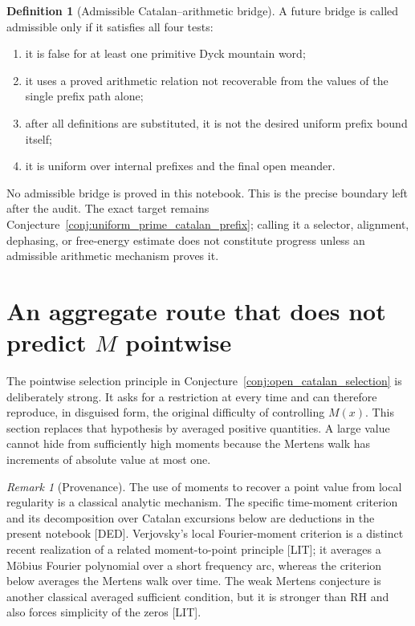 \documentclass[11pt]{amsart}
\numberwithin{equation}{section}
\theoremstyle{plain}
\theoremstyle{definition}
\newtheorem{definition}[theorem]{Definition}
\theoremstyle{remark}
\newtheorem{remark}[theorem]{Remark}
\newcommand{\Mert}{M}
\begin{document}
\begin{definition}[Admissible Catalan--arithmetic bridge]
\label{def:admissible_bridge}
A future bridge is called admissible only if it satisfies all four tests:
\begin{enumerate}[label=(\roman*)]
\item it is false for at least one primitive Dyck mountain word;
\item it uses a proved arithmetic relation not recoverable from the values of
      the single prefix path alone;
\item after all definitions are substituted, it is not the desired uniform
      prefix bound itself;
\item it is uniform over internal prefixes and the final open meander.
\end{enumerate}
\end{definition}

No admissible bridge is proved in this notebook.  This is the precise boundary
left after the audit.  The exact target remains
Conjecture~\ref{conj:uniform_prime_catalan_prefix}; calling it a selector,
alignment, dephasing, or free-energy estimate does not constitute progress
unless an admissible arithmetic mechanism proves it.

\section{An aggregate route that does not predict $\Mert$ pointwise}
\label{sec:aggregate_moment_route}

The pointwise selection principle in
Conjecture~\ref{conj:open_catalan_selection} is deliberately strong.  It asks
for a restriction at every time and can therefore reproduce, in disguised
form, the original difficulty of controlling $\Mert(x)$.  This section replaces
that hypothesis by averaged positive quantities.  A large value cannot hide
from sufficiently high moments because the Mertens walk has increments of
absolute value at most one.

\begin{remark}[Provenance]
\label{rem:aggregate_provenance}
The use of moments to recover a point value from local regularity is a classical
analytic mechanism.  The specific time-moment criterion and its decomposition
over Catalan excursions below are deductions in the present notebook
\textnormal{[DED]}.  Verjovsky's local Fourier-moment criterion is a distinct
recent realization of a related moment-to-point principle \cite{Verjovsky2026}
\textnormal{[LIT]}; it averages a M\"obius Fourier polynomial over a short
frequency arc, whereas the criterion below averages the Mertens walk over
time.  The weak Mertens conjecture is another classical averaged sufficient
condition, but it is stronger than RH and also forces simplicity of the zeros
\cite{Ng2004} \textnormal{[LIT]}.
\end{remark}
\end{document}

